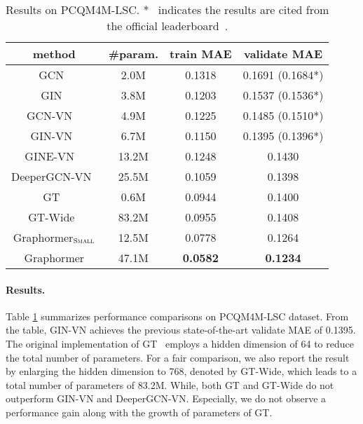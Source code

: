 \documentclass{article}
\begin{document}
\begin{table}[ht]
\small
\centering
\caption{Results on PCQM4M-LSC. * \ indicates the results are cited from the official leaderboard~\cite{hu2021ogb}. }
\label{tab:pcq-table}
\begin{tabular}{c|c|cc}
\toprule
method            & \#param. & train MAE     & validate MAE       \\ \hline
GCN~\cite{kipf2016semi}  & 2.0M & 0.1318   & 0.1691 (0.1684*)  \\

GIN~\cite{xu2018how} & 3.8M & 0.1203 & 0.1537 (0.1536*)   \\ 

GCN-{\scriptsize VN} ~\cite{kipf2016semi,gilmer2017neural} & 4.9M & 0.1225  & 0.1485 (0.1510*)  \\

GIN-{\scriptsize VN}~\cite{xu2018how,gilmer2017neural} & 6.7M & 0.1150   & 0.1395 (0.1396*)   \\ 

GINE-{\scriptsize VN} ~\cite{brossard2020graph,gilmer2017neural} & 13.2M & 0.1248 & 0.1430  \\ 

DeeperGCN-{\scriptsize VN}~\cite{li2020deepergcn,gilmer2017neural} & 25.5M & 0.1059        & 0.1398   \\

\hline
GT~\cite{dwivedi2021generalization}  & 0.6M & 0.0944 & 0.1400  \\ 

GT-{\scriptsize Wide}~\cite{dwivedi2021generalization} & 83.2M  & 0.0955 & 0.1408 \\ 

\hline

Graphormer$_{\small \textsc{Small}}$ & 12.5M &  0.0778  & 0.1264   \\ 
Graphormer & 47.1M  & \textbf{0.0582} & \textbf{0.1234}    \\
\bottomrule
\end{tabular}
\end{table}

\paragraph{Results.} Table \ref{tab:pcq-table} summarizes performance comparisons on PCQM4M-LSC dataset. From the table, GIN-{\scriptsize VN} achieves the previous state-of-the-art validate MAE of 0.1395. The original implementation of GT~\cite{dwivedi2021generalization} employs a hidden dimension of 64 to reduce the total number of parameters. For a fair comparison, we also report the result by enlarging the hidden dimension to 768, denoted by GT-{\scriptsize Wide}, which leads to a total number of parameters of 83.2M. While, both GT and GT-{\scriptsize Wide} do not outperform GIN-{\scriptsize VN} and DeeperGCN-{\scriptsize VN}. Especially, we do not observe a performance gain along with the growth of parameters of GT.
\end{document}

